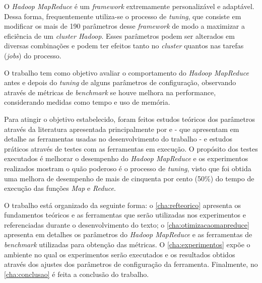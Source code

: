 O \textit{Hadoop MapReduce} é um \textit{\gls{framework}} extremamente personalizável e adaptável. Dessa forma, frequentemente utiliza-se o processo de \textit{\gls{tuning}}, que consiste em modificar os mais de 190 parâmetros desse \textit{\gls{framework}} de modo a maximizar a eficiência de um \textit{cluster Hadoop}. Esses parâmetros podem ser alterados em diversas combinações e podem ter efeitos tanto no \textit{cluster} quantos nas tarefas (\textit{jobs}) do processo.

O trabalho tem como objetivo avaliar o comportamento do \textit{Hadoop MapReduce} antes e depois do \textit{\gls{tuning}} de alguns parâmetros de configuração, observando através de métricas de \textit{\gls{benchmark}} se houve melhora na performance, considerando medidas como tempo e uso de memória.

Para atingir o objetivo estabelecido, foram feitos estudos teóricos dos parâmetros através da literatura apresentada principalmente por \textcite{HadoopBook15} e \textcite{ProHadoop09} - que apresentam em detalhe as ferramentas usadas no desenvolvimento do trabalho - e estudos práticos através de testes com as ferramentas em execução. O propósito dos testes executados é melhorar o desempenho do \textit{Hadoop MapReduce} e os experimentos realizados mostram o quão poderoso é o processo de \textit{\gls{tuning}}, visto que foi obtida uma melhora de desempenho de mais de cinquenta por cento (50\%) do tempo de execução das funções \textit{Map} e \textit{Reduce}.

O trabalho está organizado da seguinte forma: o \autoref{cha:refteorico} apresenta os fundamentos teóricos e as ferramentas que serão utilizadas nos experimentos e referenciadas durante o desenvolvimento do texto; o \autoref{cha:otimizacaomapreduce} apresenta em detalhes os parâmetros do \textit{Hadoop MapReduce} e as ferramentas de \textit{\gls{benchmark}} utilizadas para obtenção das métricas. O \autoref{cha:experimentos} expõe o ambiente no qual os experimentos serão executados e os resultados obtidos através dos ajustes dos parâmetros de configuração da ferramenta. Finalmente, no \autoref{cha:conclusao} é feita a conclusão do trabalho.